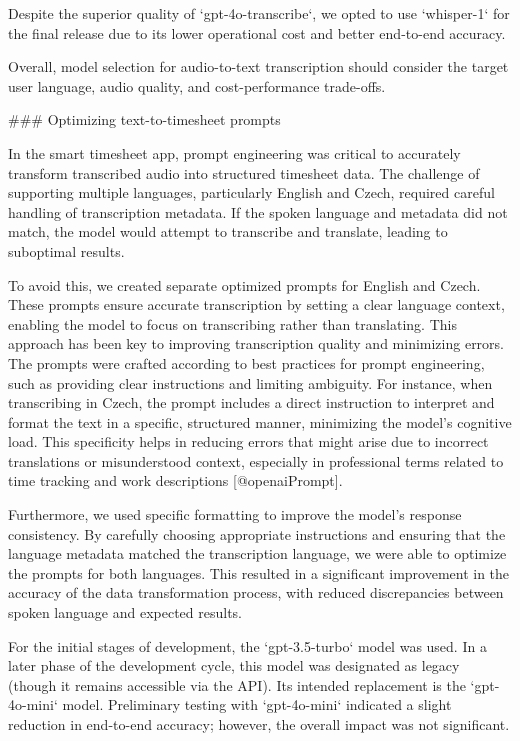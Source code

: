 \documentclass[
  digital,     %
  oneside,     %
  nosansbold,  %
  nocolorbold, %
  lof,         %
  lot,         %
]{fithesis4}
\begin{document}
\shorthandoff{-}
\begin{markdown}

Despite the superior quality of `gpt-4o-transcribe`, we opted to use `whisper-1` for the final release due to its lower operational cost and better end-to-end accuracy.

Overall, model selection for audio-to-text transcription should consider the target user language, audio quality, and cost-performance trade-offs.

### Optimizing text-to-timesheet prompts

In the smart timesheet app, prompt engineering was critical to accurately transform transcribed audio into structured timesheet data. The challenge of supporting multiple languages, particularly English and Czech, required careful handling of transcription metadata. If the spoken language and metadata did not match, the model would attempt to transcribe and translate, leading to suboptimal results.

To avoid this, we created separate optimized prompts for English and Czech. These prompts ensure accurate transcription by setting a clear language context, enabling the model to focus on transcribing rather than translating. This approach has been key to improving transcription quality and minimizing errors. The prompts were crafted according to best practices for prompt engineering, such as providing clear instructions and limiting ambiguity. For instance, when transcribing in Czech, the prompt includes a direct instruction to interpret and format the text in a specific, structured manner, minimizing the model’s cognitive load. This specificity helps in reducing errors that might arise due to incorrect translations or misunderstood context, especially in professional terms related to time tracking and work descriptions [@openaiPrompt].

Furthermore, we used specific formatting to improve the model’s response consistency. By carefully choosing appropriate instructions and ensuring that the language metadata matched the transcription language, we were able to optimize the prompts for both languages. This resulted in a significant improvement in the accuracy of the data transformation process, with reduced discrepancies between spoken language and expected results.

For the initial stages of development, the `gpt-3.5-turbo` model was used. In a later phase of the development cycle, this model was designated as legacy (though it remains accessible via the API). Its intended replacement is the `gpt-4o-mini` model. Preliminary testing with `gpt-4o-mini` indicated a slight reduction in end-to-end accuracy; however, the overall impact was not significant.


\end{markdown}
\end{document}
